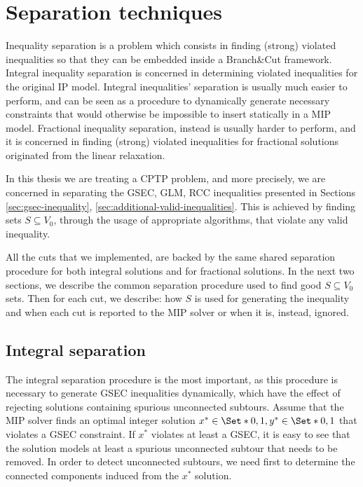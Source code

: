 \section{Separation techniques}

Inequality separation is a problem which consists in finding (strong) violated inequalities so that they can be embedded inside a Branch\&Cut framework.
Integral inequality separation is concerned in determining violated inequalities for the original IP model.
Integral inequalities' separation is usually much easier to perform, and can be seen as a procedure to dynamically generate necessary constraints that would otherwise be impossible to insert statically in a MIP model.
Fractional inequality separation, instead is usually harder to perform, and it is concerned in finding (strong) violated inequalities for fractional solutions originated from the linear relaxation.

In this thesis we are treating a CPTP problem, and more precisely, we are concerned in separating the GSEC, GLM, RCC inequalities presented in Sections \ref{sec:gsec-inequality}, \ref{sec:additional-valid-inequalities}.
This is achieved by finding sets $S \subseteq V_0$, through the usage of appropriate algorithms, that violate any valid inequality.

All the cuts that we implemented, are backed by the same shared separation procedure for both integral solutions and for fractional solutions.
In the next two sections, we describe the common separation procedure used to find good $S \subseteq V_0$ sets.
Then for each cut, we describe: how $S$ is used for generating the inequality and when each cut is reported to the MIP solver or when it is, instead, ignored.

\subsection{Integral separation}\label{sec:integral-separation}
The integral separation procedure is the most important, as this procedure is necessary to generate GSEC inequalities dynamically, which have the effect of rejecting solutions containing spurious unconnected subtours.
Assume that the MIP solver finds an optimal integer solution $x^* \in \Set*{0, 1}, y^* \in \Set*{0, 1}$ that violates a GSEC constraint.
If $x^*$ violates at least a GSEC, it is easy to see that the solution models at least a spurious unconnected subtour that needs to be removed.
In order to detect unconnected subtours, we need first to determine the connected components induced from the $x^*$ solution.

